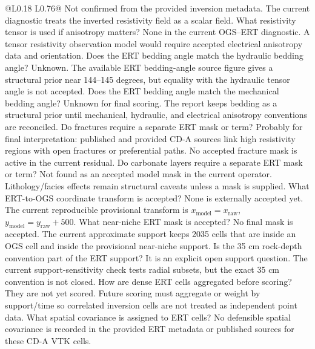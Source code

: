 \begin{longtable}{@{}L{0.18\textwidth} L{0.76\textwidth}@{}}
{Not confirmed from the provided inversion metadata.  The current diagnostic treats the
inverted resistivity field as a scalar field.}
{ What resistivity tensor is used if anisotropy matters?}
{None in the current OGS--ERT diagnostic.  A tensor resistivity observation model
would require accepted electrical anisotropy data and orientation.}
{ Does the ERT bedding angle match the hydraulic bedding angle?}
{Unknown.  The available ERT bedding-angle source figure gives a structural prior
near 144--145 degrees, but equality with the hydraulic tensor angle is not accepted.}
{ Does the ERT bedding angle match the mechanical bedding angle?}
{Unknown for final scoring.  The report keeps bedding as a structural prior until
mechanical, hydraulic, and electrical anisotropy conventions are reconciled.}
{ Do fractures require a separate ERT mask or term?}
{Probably for final interpretation: published and provided CD-A sources link high resistivity
regions with open fractures or preferential paths.  No accepted fracture mask is
active in the current residual.}
{ Do carbonate layers require a separate ERT mask or term?}
{Not found as an accepted model mask in the current operator.  Lithology/facies effects
remain structural caveats unless a mask is supplied.}
{ What ERT-to-OGS coordinate transform is accepted?}
{None is externally accepted yet.  The current reproducible provisional transform is
\(x_{\mathrm{model}}=x_{\mathrm{raw}}\), \(y_{\mathrm{model}}=y_{\mathrm{raw}}+500\).}
{ What near-niche ERT mask is accepted?}
{No final mask is accepted.  The current approximate support keeps 2035 cells that
are inside an OGS cell and inside the provisional near-niche support.}
{ Is the 35 cm rock-depth convention part of the ERT support?}
{It is an explicit open support question.  The current support-sensitivity check
tests radial subsets, but the exact 35 cm convention is not closed.}
{ How are dense ERT cells aggregated before scoring?}
{They are not yet scored.  Future scoring must aggregate or weight by support/time so
correlated inversion cells are not treated as independent point data.}
{ What spatial covariance is assigned to ERT cells?}
{No defensible spatial covariance is recorded in the provided ERT metadata or published
sources for these CD-A VTK cells.}

\end{longtable}
